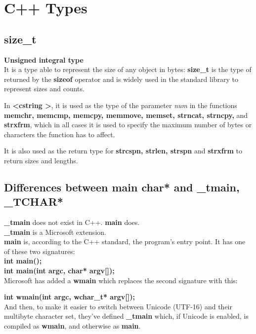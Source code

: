 	\chapter{C++ Types}	

	\section{size\_t}
	\textbf{Unsigned integral type}\\
	
	It is a type able to represent the size of any object in bytes: \textbf{size\_t} is the type of returned by the \textbf{sizeof} operator and is widely used in the standard library to represent sizes and counts.
	
	In \textbf{\textless cstring \textgreater}, it is used as the type of the parameter \textit{num} in the functions \textbf{memchr, memcmp, memcpy, memmove, memset, strncat, strncpy,} and \textbf{strxfrm}, which in all cases it is used to specify the maximum number of bytes or characters the function has to affect.
	
	It is also used as the return type for \textbf{strcspn, strlen, strspn} and \textbf{strxfrm} to return sizes and lengths.
	
	\section{Differences between main char* and \_tmain, \_TCHAR*}
	\textbf{\_tmain} does not exist in C++. \textbf{main} does.\\
	
	\textbf{\_tmain} is a Microsoft extension.\\
	
	\textbf{main} is, according to the C++ standard, the program's entry point. It has one of these two signatures:\\
	
	\textbf{int main();\\
		int main(int argc, char* argv[]);}\\
	
	Microsoft has added a \textbf{wmain} which replaces the second signature with this:
	
	\textbf{int wmain(int argc, wchar\_t* argv[]);}\\
	
	And then, to make it easier to switch between Unicode (UTF-16) and their multibyte character set, they've defined \textbf{\_tmain} which, if Unicode is enabled, is compiled as \textbf{wmain}, and otherwise as \textbf{main}.\\
	
